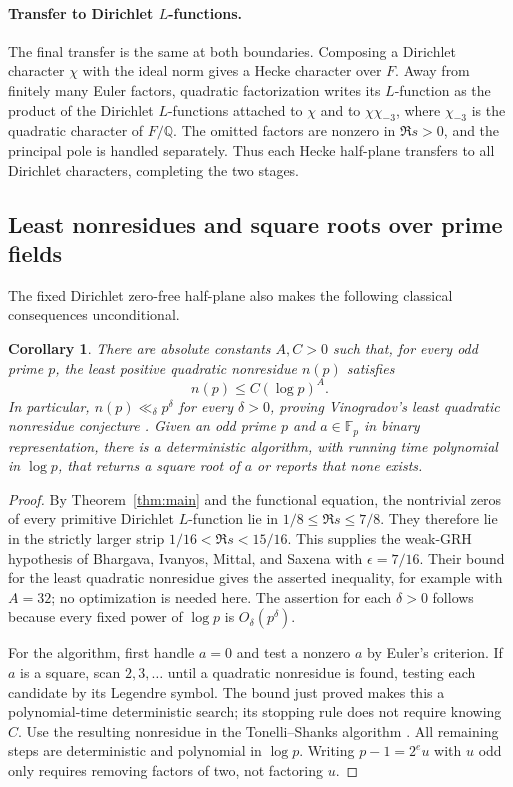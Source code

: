 \documentclass[11pt,a4paper]{article}
\numberwithin{equation}{section}
\numberwithin{figure}{section}
\newtheorem{corollary}[theorem]{Corollary}
\theoremstyle{definition}
\theoremstyle{remark}
\begin{document}
\paragraph{Transfer to Dirichlet $L$-functions.}
The final transfer is the same at both boundaries. Composing a Dirichlet
character $\chi$ with the ideal norm gives a Hecke character over $F$.
Away from finitely many Euler factors, quadratic factorization writes its
$L$-function as the product of the Dirichlet $L$-functions attached to $\chi$
and to $\chi\chi_{-3}$, where $\chi_{-3}$ is the quadratic character of
$F/\mathbb Q$. The omitted factors are nonzero in $\Re s>0$, and the
principal pole is handled separately. Thus each Hecke half-plane transfers
to all Dirichlet characters, completing the two stages.

\subsection*{Least nonresidues and square roots over prime fields}

The fixed Dirichlet zero-free half-plane also makes the following
classical consequences unconditional.

\begin{corollary}\label{cor:nonresidues-square-roots}
There are absolute constants $A,C>0$ such that, for every odd prime $p$,
the least positive quadratic nonresidue $n(p)$ satisfies
\[
 n(p)\le C(\log p)^A.
\]
In particular, $n(p)\ll_\delta p^\delta$ for every $\delta>0$, proving
Vinogradov's least quadratic nonresidue conjecture
\cite[Conjecture 1.1]{TaoNonresidues}.
Given an odd prime $p$ and $a\in\mathbb F_p$ in binary representation,
there is a deterministic algorithm, with running time polynomial in
$\log p$, that returns a square root of $a$ or reports that none exists.
\end{corollary}

\begin{proof}
By Theorem~\ref{thm:main} and the functional equation, the nontrivial
zeros of every primitive Dirichlet $L$-function lie in
$1/8\le\Re s\le7/8$. They therefore lie in the strictly larger strip
$1/16<\Re s<15/16$. This supplies the weak-GRH hypothesis of
Bhargava, Ivanyos, Mittal, and Saxena
\cite[Conjecture 6.3 and Theorem 6.7]{BIMS} with $\epsilon=7/16$.
Their bound for the least quadratic nonresidue gives the asserted
inequality, for example with $A=32$; no optimization is needed here.
The assertion for each $\delta>0$ follows because every fixed power
of $\log p$ is $O_\delta(p^\delta)$.

For the algorithm, first handle $a=0$ and test a nonzero $a$ by Euler's
criterion. If $a$ is a square, scan $2,3,\ldots$ until a quadratic
nonresidue is found, testing each candidate by its Legendre symbol.
The bound just proved makes this a polynomial-time deterministic
search; its stopping rule does not require knowing $C$.
Use the resulting nonresidue in the Tonelli--Shanks algorithm
\cite[Section 2.9, Algorithm 3 and Lemma 2.9.5]{Galbraith}.
All remaining steps are deterministic and polynomial in $\log p$.
Writing $p-1=2^e u$ with $u$ odd only requires removing factors of two,
not factoring $u$.
\end{proof}
\end{document}
